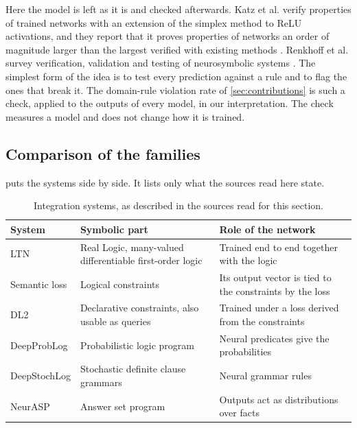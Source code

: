 Here the model is left as it is and checked afterwards. Katz et al. verify
properties of trained networks with an extension of the simplex method to
ReLU activations, and they report that it proves properties of networks an
order of magnitude larger than the largest verified with existing methods
\citep{katz2017reluplex}. Renkhoff et al.
survey verification, validation and testing of neurosymbolic systems
\citep{renkhoff2024survey}. The simplest form of the idea is to test every
prediction against a rule and to flag the ones that break it. The domain-rule
violation rate of \cref{sec:contributions} is such a check, applied to the
outputs of every model, in our interpretation. The check measures a model and
does not change how it is trained.

\subsection{Comparison of the families}
\label{sec:integration-comparison}

 puts the systems side by side. It lists only
what the sources read here state.

\begin{table}[htbp]
\centering
\footnotesize
\setlength{\tabcolsep}{3pt}
\caption{Integration systems, as described in the sources read for this section.}
\label{tab:integration-systems}
\begin{tabular}{@{}p{2.3cm}p{5.2cm}p{5.0cm}@{}}
\toprule
System & Symbolic part & Role of the network \\
\midrule
LTN & Real Logic, many-valued differentiable first-order logic
  & Trained end to end together with the logic \\
Semantic loss & Logical constraints
  & Its output vector is tied to the constraints by the loss \\
DL2 & Declarative constraints, also usable as queries
  & Trained under a loss derived from the constraints \\
DeepProbLog & Probabilistic logic program
  & Neural predicates give the probabilities \\
DeepStochLog & Stochastic definite clause grammars
  & Neural grammar rules \\
NeurASP & Answer set program
  & Outputs act as distributions over facts \\
\bottomrule
\end{tabular}
\end{table}

